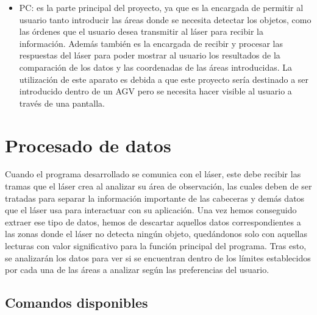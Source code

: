\begin{itemize}
    \item PC: es la parte principal del proyecto, ya que es la encargada de permitir al usuario tanto introducir las áreas donde se necesita detectar los objetos, como las órdenes que el usuario desea transmitir al láser para recibir la información. Además también es la encargada de recibir y procesar las respuestas del láser para poder mostrar al usuario los resultados de la comparación de los datos y las coordenadas de las áreas introducidas. La utilización de este aparato es debida a que este proyecto sería destinado a ser introducido dentro de un AGV pero se necesita hacer visible al usuario a través de una pantalla.\\ 
\end{itemize}

\section{Procesado de datos}

Cuando el programa desarrollado se comunica con el láser, este debe recibir las tramas que el láser crea al analizar su área de observación, las cuales deben de ser tratadas para separar la información importante de las cabeceras y demás datos que el láser usa para interactuar con su aplicación. Una vez hemos conseguido extraer ese tipo de datos, hemos de descartar aquellos datos correspondientes a las zonas donde el láser no detecta ningún objeto, quedándonos solo con aquellas lecturas con valor significativo para la función principal del programa. Tras esto, se analizarán los datos para ver si se encuentran dentro de los límites establecidos por cada una de las áreas a analizar según las preferencias del usuario.\\

\subsection{Comandos disponibles}


